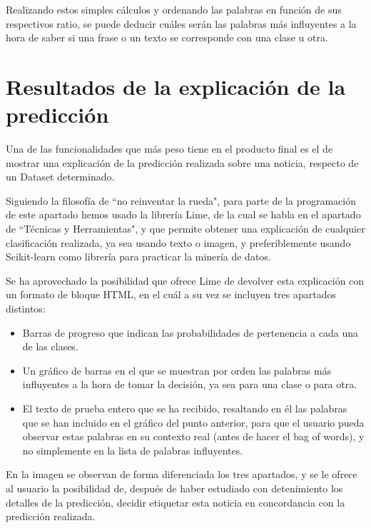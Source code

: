 Realizando estos simples cálculos y ordenando las palabras en función de sus respectivos ratio, se puede deducir cuáles serán las palabras más influyentes a la hora de saber si una frase o un texto se corresponde con una clase u otra.

\section{Resultados de la explicación de la predicción}

Una de las funcionalidades que más peso tiene en el producto final es el de mostrar una explicación de la predicción realizada sobre una noticia, respecto de un Dataset determinado. 

Siguiendo la filosofía de ``no reinventar la rueda", para parte de la programación de este apartado hemos usado la librería Lime, de la cual se habla en el apartado de ``Técnicas y Herramientas", y que permite obtener una explicación de cualquier clasificación realizada, ya sea usando texto o imagen, y preferiblemente usando Scikit-learn como librería para practicar la minería de datos.

Se ha aprovechado la posibilidad que ofrece Lime de devolver esta explicación con un formato de bloque HTML, en el cuál a su vez se incluyen tres apartados distintos:

\begin{itemize}

\item Barras de progreso que indican las probabilidades de pertenencia a cada una de las clases.

\item Un gráfico de barras en el que se muestran por orden las palabras más influyentes a la hora de tomar la decisión, ya sea para una clase o para otra.

\item El texto de prueba entero que se ha recibido, resaltando en él las palabras que se han incluido en el gráfico del punto anterior, para que el usuario pueda observar estas palabras en su contexto real (antes de hacer el bag of words), y no simplemente en la lista de palabras influyentes.

\end{itemize}


En la imagen se observan de forma diferenciada los tres apartados, y se le ofrece al usuario la posibilidad de, después de haber estudiado con detenimiento los detalles de la predicción, decidir etiquetar esta noticia en concordancia con la predicción realizada.

